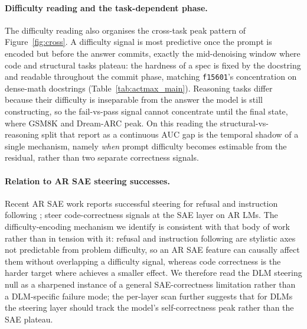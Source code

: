 \documentclass[11pt]{article}
\begin{document}
\paragraph{Difficulty reading and the task-dependent phase.}
\label{sec:diff_phase}
The difficulty reading also organises the cross-task peak pattern of Figure~\ref{fig:cross}.
A difficulty signal is most predictive once the prompt is encoded but before the answer commits, exactly the mid-denoising window where code and structural tasks plateau: the hardness of a spec is fixed by the docstring and readable throughout the commit phase, matching \texttt{f15601}'s concentration on dense-math docstrings (Table~\ref{tab:actmax_main}).
Reasoning tasks differ because their difficulty is inseparable from the answer the model is still constructing, so the fail-vs-pass signal cannot concentrate until the final state, where GSM8K and Dream-ARC peak.
On this reading the structural-vs-reasoning split that \citet{chiu2026probe} report as a continuous AUC gap is the temporal shadow of a single mechanism, namely \emph{when} prompt difficulty becomes estimable from the residual, rather than two separate correctness signals.

\paragraph{Relation to AR SAE steering successes.}
\label{sec:relation_ar_sae}
Recent AR SAE work reports successful steering for refusal \citep{obrien2024refusal} and instruction following \citep{he2025saif}; \citet{tahimic2025correctness} steer code-correctness signals at the SAE layer on AR LMs.
The difficulty-encoding mechanism we identify is consistent with that body of work rather than in tension with it: refusal and instruction following are stylistic axes not predictable from problem difficulty, so an AR SAE feature can causally affect them without overlapping a difficulty signal, whereas code correctness is the harder target where \citet{tahimic2025correctness} achieves a smaller effect.
We therefore read the DLM steering null as a sharpened instance of a general SAE-correctness limitation rather than a DLM-specific failure mode; the per-layer scan further suggests that for DLMs the steering layer should track the model's self-correctness peak rather than the SAE plateau.
\end{document}
